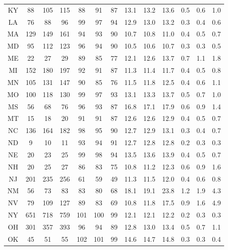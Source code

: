 \begin{table}
\begin{tabular}{ccccccccccccc}
   KY &    88 &   105 &   115 &   88 &   91 &   87 & 13.1 & 13.2 & 13.6 & 0.5 & 0.6 & 1.0 \\
   LA &    76 &    88 &    96 &   99 &   97 &   94 & 12.9 & 13.0 & 13.2 & 0.3 & 0.4 & 0.6 \\
   MA &   129 &   149 &   161 &   94 &   93 &   90 & 10.7 & 10.8 & 11.0 & 0.4 & 0.5 & 0.7 \\
   MD &    95 &   112 &   123 &   96 &   94 &   90 & 10.5 & 10.6 & 10.7 & 0.3 & 0.3 & 0.5 \\
   ME &    22 &    27 &    29 &   89 &   85 &   77 & 12.1 & 12.6 & 13.7 & 0.7 & 1.1 & 1.8 \\
   MI &   152 &   180 &   197 &   92 &   91 &   87 & 11.3 & 11.4 & 11.7 & 0.4 & 0.5 & 0.8 \\
   MN &   105 &   131 &   147 &   90 &   85 &   76 & 11.5 & 11.8 & 12.5 & 0.4 & 0.6 & 1.1 \\
   MO &   100 &   118 &   130 &   99 &   97 &   93 & 13.1 & 13.3 & 13.7 & 0.5 & 0.7 & 1.0 \\
   MS &    56 &    68 &    76 &   96 &   93 &   87 & 16.8 & 17.1 & 17.9 & 0.6 & 0.9 & 1.4 \\
   MT &    15 &    18 &    20 &   91 &   91 &   87 & 12.6 & 12.6 & 12.9 & 0.4 & 0.5 & 0.7 \\
   NC &   136 &   164 &   182 &   98 &   95 &   90 & 12.7 & 12.9 & 13.1 & 0.3 & 0.4 & 0.7 \\
   ND &     9 &    10 &    11 &   93 &   94 &   91 & 12.7 & 12.8 & 12.8 & 0.2 & 0.3 & 0.3 \\
   NE &    20 &    23 &    25 &   99 &   98 &   94 & 13.5 & 13.6 & 13.9 & 0.4 & 0.5 & 0.7 \\
   NH &    20 &    25 &    27 &   86 &   83 &   75 & 10.8 & 11.2 & 12.3 & 0.6 & 0.9 & 1.6 \\
   NJ &   201 &   235 &   256 &   61 &   59 &   49 & 11.3 & 11.5 & 12.0 & 0.4 & 0.6 & 0.8 \\
   NM &    56 &    73 &    83 &   83 &   80 &   68 & 18.1 & 19.1 & 23.8 & 1.2 & 1.9 & 4.3 \\
   NV &    79 &   109 &   127 &   89 &   83 &   69 & 10.8 & 11.8 & 17.5 & 0.9 & 1.6 & 4.9 \\
   NY &   651 &   718 &   759 &  101 &  100 &   99 & 12.1 & 12.1 & 12.2 & 0.2 & 0.3 & 0.3 \\
   OH &   301 &   357 &   393 &   96 &   94 &   89 & 12.8 & 13.0 & 13.4 & 0.5 & 0.7 & 1.1 \\
   OK &    45 &    51 &    55 &  102 &  101 &   99 & 14.6 & 14.7 & 14.8 & 0.3 & 0.3 & 0.4 \\

\end{tabular}
\end{table}
